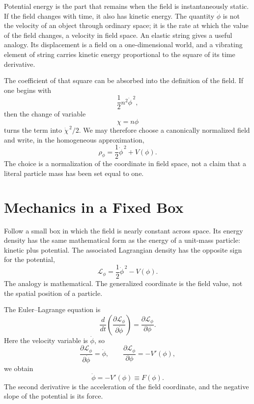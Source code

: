 Potential energy is the part that remains when the field is instantaneously static. If the field changes with time, it also has kinetic energy. The quantity \(\dot\phi\) is not the velocity of an object through ordinary space; it is the rate at which the value of the field changes, a velocity in field space. An elastic string gives a useful analogy. Its displacement is a field on a one-dimensional world, and a vibrating element of string carries kinetic energy proportional to the square of its time derivative.

The coefficient of that square can be absorbed into the definition of the field. If one begins with
\begin{equation}
\frac12 n^2\dot\phi^{\,2},
\end{equation}
then the change of variable
\begin{equation}
\chi=n\phi
\end{equation}
turns the term into \(\dot\chi^{\,2}/2\). We may therefore choose a canonically normalized field and write, in the homogeneous approximation,
\begin{equation}
\rho_\phi=\frac12\dot\phi^{\,2}+V(\phi).
\label{eq:c09-rho-homogeneous}
\end{equation}
The choice is a normalization of the coordinate in field space, not a claim that a literal particle mass has been set equal to one.

\section{Mechanics in a Fixed Box}

Follow a small box in which the field is nearly constant across space. Its energy density has the same mathematical form as the energy of a unit-mass particle: kinetic plus potential. The associated Lagrangian density has the opposite sign for the potential,
\begin{equation}
\mathcal L_\phi
=\frac12\dot\phi^{\,2}-V(\phi).
\label{eq:c09-lagrangian-density}
\end{equation}
The analogy is mathematical. The generalized coordinate is the field value, not the spatial position of a particle.

The Euler--Lagrange equation is
\begin{equation}
\frac{d}{dt}
\left(
\frac{\partial\mathcal L_\phi}{\partial\dot\phi}
\right)
=
\frac{\partial\mathcal L_\phi}{\partial\phi}.
\label{eq:c09-el-fixed}
\end{equation}
Here the velocity variable is \(\dot\phi\), so
\begin{equation}
\frac{\partial\mathcal L_\phi}{\partial\dot\phi}=\dot\phi,
\qquad
\frac{\partial\mathcal L_\phi}{\partial\phi}=-V'(\phi),
\end{equation}
we obtain
\begin{equation}
\ddot\phi=-V'(\phi)\equiv F(\phi).
\label{eq:c09-fixed-eom}
\end{equation}
The second derivative is the acceleration of the field coordinate, and the negative slope of the potential is its force.

